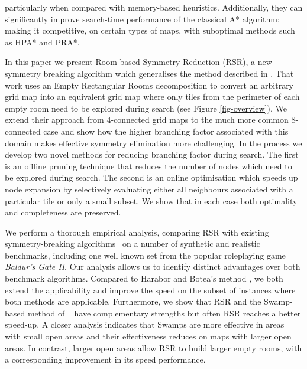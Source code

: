 particularly when compared with memory-based heuristics.
Additionally, they can significantly improve search-time performance of the classical A* algorithm; making it competitive,
on certain types of maps, with suboptimal methods such as HPA* and PRA*.
\par
In this paper we present Room-based Symmetry Reduction (RSR),
a new symmetry breaking algorithm which generalises the method described in \cite{harabor10}.
That work uses an Empty Rectangular Rooms decomposition to convert an arbitrary grid map into an
equivalent grid map where only tiles from the perimeter of each empty room need to be explored
during search (see Figure \ref{fig-overview}).
We extend their approach from 4-connected grid maps to the much more common 8-connected case
and show how the higher branching factor associated 
with this domain makes effective symmetry elimination more challenging.
In the process we develop two novel methods for reducing branching factor during search.
The first is an offline pruning technique that reduces the number of nodes which
need to be explored during search.
The second is an online optimisation which speeds up node expansion by selectively evaluating either all neighbours
associated with a particular tile or only a small subset.
We show that in each case both optimality and completeness are preserved.

We perform a thorough empirical analysis, comparing RSR with existing
symmetry-breaking algorithms~\cite{pochter10,harabor10}
on a number of synthetic and realistic benchmarks, including one well known set 
from the popular roleplaying game \emph{Baldur's Gate II}.
Our analysis allows us to identify distinct advantages over both benchmark algorithms.
Compared to Harabor and Botea's method , 
we both extend the applicability and improve the speed
on the subset of instances where both methods are applicable.
Furthermore, we show that RSR and the Swamp-based method of 
\citeauthor{pochter10}~
have complementary strengths but often RSR reaches a better speed-up.
A closer analysis indicates that Swamps are more effective in areas with
small open areas and their effectiveness reduces on maps with larger open areas.
In contrast, larger open areas allow RSR to build larger empty rooms,
with a corresponding improvement in its speed performance.




